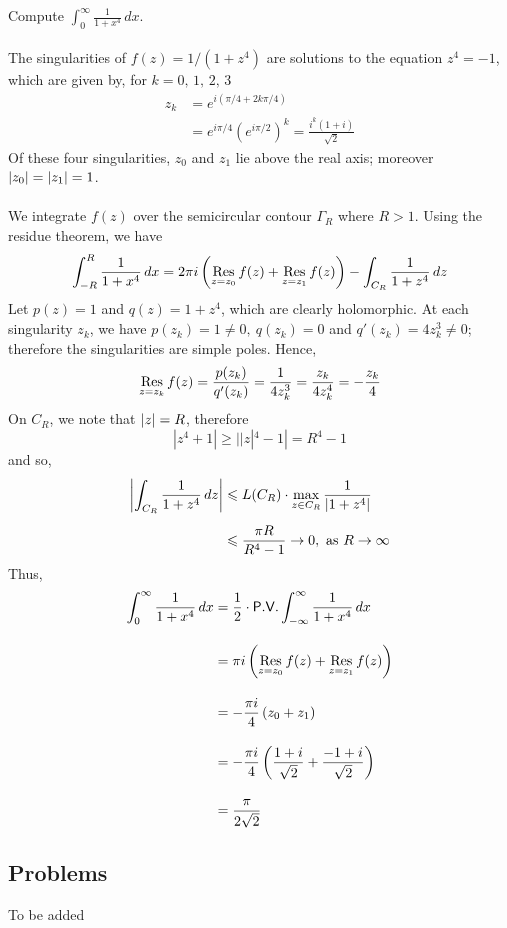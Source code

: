 \begin{example}
Compute $\displaystyle \int_0^\infty\frac{1}{1 + x^4}\,dx$.\\
\\
The singularities of $f(z) = 1/(1 + z^4)$ are solutions to the equation $z^4 = -1$, which are given by, for $k = 0,\,1,\,2,\,3$
\begin{align*}
z_k &= e^{i(\pi/4 + 2k\pi/4)}\\[0.5em]
 &= e^{i\pi/4} (e^{i\pi/2})^k = \frac{i^k(1 + i)}{\sqrt{2}}
\end{align*}
Of these four singularities, $z_0$ and $z_1$ lie above the real axis; moreover $\left\lvert z_0\right\rvert = \left\lvert z_1\right\rvert = 1$.\\
\\
We integrate $f(z)$ over the semicircular contour $\Gamma_R$ where $R > 1$. Using the residue theorem, we have
\[\int_{-R}^R\frac{1}{1 + x^4}\,dx = 2\pi i\left(\underset{z = {z_0}}{\operatorname{Res}}\,f(z) + \underset{z = {z_1}}{\operatorname{Res}}\,f(z) \right) - \int_{C_R}\frac{1}{1 + z^4}\,dz\]
Let $p(z) = 1$ and $q(z) = 1 + z^4$, which are clearly holomorphic. At each singularity $z_k$, we have $p(z_k) = 1 \neq 0,\ q(z_k) = 0$ and $q'(z_k) = 4z_k^3 \neq 0$; therefore the singularities are simple poles. Hence,
\[\underset{z = {z_k}}{\operatorname{Res}}\,f(z) = \frac{p(z_k)}{q'(z_k)} = \frac{1}{4z_k^3} = \frac{z_k}{4z_k^4} = -\frac{z_k}{4}\]
On $C_R$, we note that $\left\lvert z\right\rvert = R$, therefore 
\[|z^4 + 1| \geq ||z|^4 - 1| = R^4 - 1\]
and so,
\begin{align*}
\left\lvert\int_{C_R}\frac{1}{1 + z^4}\,dz\right\rvert &\leqslant L(C_R)\cdot \max_{z \in C_R}\frac{1}{|1 + z^4|}\\[0.5em]
 &\leqslant \frac{\pi R}{R^4 - 1} \to 0,\ \text{as }R \to \infty
\end{align*}
Thus,
\begin{align*}
\int_0^\infty\frac{1}{1 + x^4}\,dx &= \frac{1}{2}\cdot\mathsf{P.V.}\int_{-\infty}^\infty\frac{1}{1 + x^4}\,dx\\[1em]
 &= \pi i\left(\underset{z = {z_0}}{\operatorname{Res}}\,f(z) + \underset{z = {z_1}}{\operatorname{Res}}\,f(z) \right)\\[1em]
 &= -\frac{\pi i}{4}\left(z_0 + z_1 \right)\\[1em]
 &= -\frac{\pi i}{4}\left(\frac{1 + i}{\sqrt{2}} + \frac{-1 + i}{\sqrt{2}} \right)\\[1em]
 &= \frac{\pi}{2\sqrt{2}}
\end{align*}
\end{example}

\vspace*{2em}

\subsection{Problems}
\vspace{0.1in}
To be added
%
